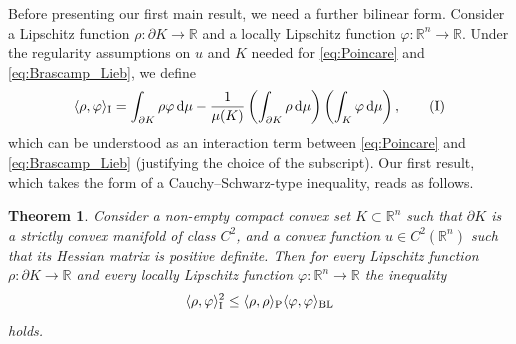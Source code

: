 \documentclass[a4paper, 11pt]{article}
\newcommand{\R}{\mathbb{R}}
\newtheorem{theorem}{Theorem}[section]
\theoremstyle{definition}
\newcommand{\di}{\, \mathrm{d}}
\begin{document}
Before presenting our first main result, we need a further bilinear form. Consider a Lipschitz function $\rho: \partial K \to \R$ and a locally Lipschitz function $\varphi: \R^n \to \R$. Under the regularity assumptions on $u$ and $K$ needed for \eqref{eq:Poincare} and \eqref{eq:Brascamp_Lieb}, we define 
\begin{equation}\label{eq:I}
    \langle \rho, \varphi \rangle_{\rm I} = \int_{\partial K} \rho \varphi \di \mu - \frac{1}{\mu(K)}\left( \int_{\partial K} \rho \di \mu \right) \left( \int_K \varphi \di \mu \right),
    \tag{I}
\end{equation}
which can be understood as an interaction term between \eqref{eq:Poincare} and \eqref{eq:Brascamp_Lieb} (justifying the choice of the subscript). Our first result, which takes the form of a Cauchy--Schwarz-type inequality, reads as follows.
\begin{theorem}\label{thm:multiplicative_form}
    Consider a non-empty compact convex set $K \subset \R^n$ such that $\partial K$ is a strictly convex manifold of class $C^2$, and a convex function $u \in C^2(\R^n)$ such that its Hessian matrix is positive definite. Then for every Lipschitz function $\rho: \partial K \to \R$ and every locally Lipschitz function $\varphi: \R^n \to \R$ the inequality 
    \begin{equation}\label{eq:multiplicative_form}
        \langle \rho, \varphi \rangle_{\rm I}^2 \leq \langle \rho, \rho \rangle_{\rm P} \langle \varphi, \varphi \rangle_{\rm BL}
    \end{equation}
    holds.
\end{theorem}
\end{document}
